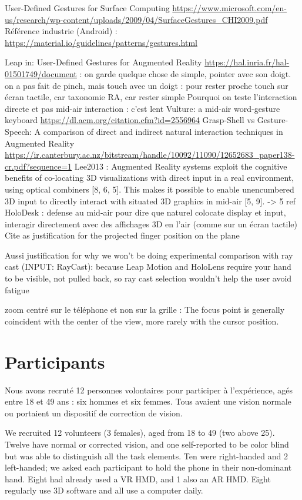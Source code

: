 User-Defined Gestures for Surface Computing \url{https://www.microsoft.com/en-us/research/wp-content/uploads/2009/04/SurfaceGestures_CHI2009.pdf}
Référence industrie (Android) : \url{https://material.io/guidelines/patterns/gestures.html}

Leap in:
User-Defined Gestures for Augmented Reality \url{https://hal.inria.fr/hal-01501749/document} : on garde quelque chose de simple, pointer avec son doigt. on a pas fait de pinch, mais touch avec un doigt : pour rester proche touch sur écran tactile, car taxonomie RA, car rester simple
Pourquoi on teste l'interaction directe et pas mid-air interaction : c'est lent Vulture: a mid-air word-gesture keyboard \url{https://dl.acm.org/citation.cfm?id=2556964}
Grasp-Shell vs Gesture-Speech: A comparison of direct and indirect natural interaction
techniques in Augmented Reality \url{https://ir.canterbury.ac.nz/bitstream/handle/10092/11090/12652683_paper138-cr.pdf?sequence=1}
Lee2013 : Augmented Reality systems exploit the cognitive benefits of co-locating 3D visualizations with direct input in a real environment, using optical combiners [8, 6, 5]. This makes it possible to enable unencumbered 3D input to directly interact with situated 3D graphics in mid-air [5, 9]. -> 5 ref HoloDesk : defense au mid-air pour dire que naturel colocate display et input, interagir directement avec des affichages 3D en l'air (comme sur un écran tactile)
Cite \cite{Chan2010} as justification for the projected finger position on the plane

Aussi justification for why we won’t be doing experimental comparison with ray cast (INPUT: RayCast): because Leap Motion and HoloLens require your hand to be visible, not pulled back, so ray cast selection wouldn’t help the user avoid fatigue

zoom centré sur le téléphone et non sur la grille : The focus point is generally coincident with the center of the view, more rarely with the cursor position. \cite{Guiard2004}


\section{Participants}
\label{sec:experiment_participants}

Nous avons recruté 12 personnes volontaires pour participer à l'expérience, agés entre 18 et 49 ans : six hommes et six femmes. Tous avaient une vision normale ou portaient un dispositif de correction de vision.

We recruited 12 volunteers (3 females), aged from 18 to 49 (two above 25). Twelve have normal or corrected vision, and one self-reported to be color blind but was able to distinguish all the task elements. Ten were right-handed and 2 left-handed; we asked each participant to hold the phone in their non-dominant hand. Eight had already used a VR HMD, and 1 also an AR HMD. Eight regularly use 3D software and all use a computer daily.


